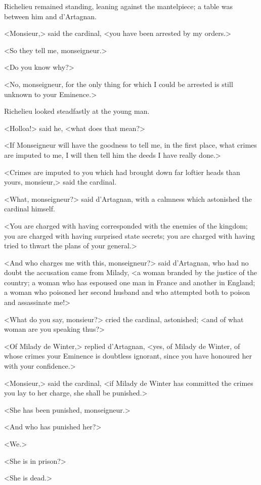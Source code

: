 Richelieu remained standing, leaning against the mantelpiece; a table was between him and d'Artagnan. 

<Monsieur,> said the cardinal, <you have been arrested by my orders.> 

<So they tell me, monseigneur.> 

<Do you know why?> 

<No, monseigneur, for the only thing for which I could be arrested is still unknown to your Eminence.> 

Richelieu looked steadfastly at the young man. 

<Holloa!> said he, <what does that mean?> 

<If Monseigneur will have the goodness to tell me, in the first place, what crimes are imputed to me, I will then tell him the deeds I have really done.> 

<Crimes are imputed to you which had brought down far loftier heads than yours, monsieur,> said the cardinal. 

<What, monseigneur?> said d'Artagnan, with a calmness which astonished the cardinal himself. 

<You are charged with having corresponded with the enemies of the kingdom; you are charged with having surprised state secrets; you are charged with having tried to thwart the plans of your general.> 

<And who charges me with this, monseigneur?> said d'Artagnan, who had no doubt the accusation came from Milady, <a woman branded by the justice of the country; a woman who has espoused one man in France and another in England; a woman who poisoned her second husband and who attempted both to poison and assassinate me!> 

<What do you say, monsieur?> cried the cardinal, astonished; <and of what woman are you speaking thus?> 

<Of Milady de Winter,> replied d'Artagnan, <yes, of Milady de Winter, of whose crimes your Eminence is doubtless ignorant, since you have honoured her with your confidence.> 

<Monsieur,> said the cardinal, <if Milady de Winter has committed the crimes you lay to her charge, she shall be punished.> 

<She has been punished, monseigneur.> 

<And who has punished her?> 

<We.> 

<She is in prison?> 

<She is dead.> 

